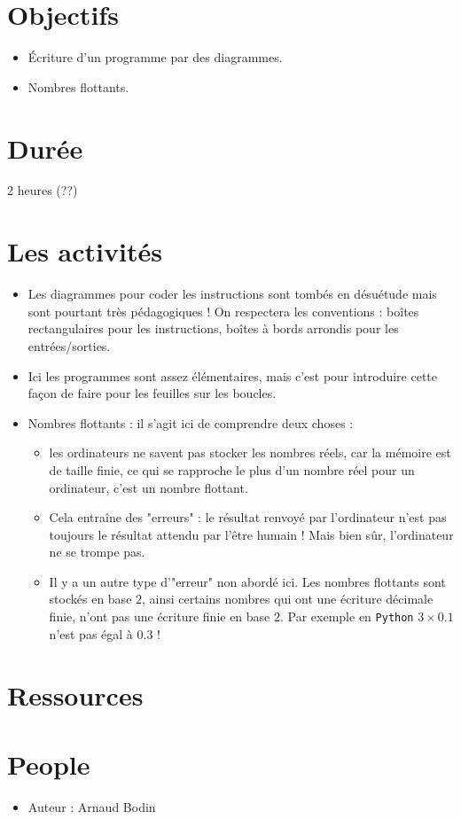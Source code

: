 \documentclass[class=report,crop=false, 12pt]{standalone}
\begin{document}



\section*{Objectifs}

\begin{itemize}
  \item \'Ecriture d'un programme par des diagrammes.
  \item Nombres flottants.
\end{itemize}


\section*{Durée}

2 heures (??)

\section*{Les activités}

\begin{itemize}
  \item Les diagrammes pour coder les instructions sont tombés en désuétude mais sont pourtant très pédagogiques ! On respectera les conventions : boîtes rectangulaires pour les instructions, boîtes à bords arrondis pour les entrées/sorties.
  
  \item Ici les programmes sont assez élémentaires, mais c'est pour introduire cette façon de faire pour les feuilles sur les boucles.
  
  \item Nombres flottants : il s'agit ici de comprendre deux choses :
  \begin{itemize}
    \item les ordinateurs ne savent pas stocker les nombres réels, car la mémoire est de taille finie, ce qui se rapproche le plus d'un nombre réel pour un ordinateur, c'est un nombre flottant.
    \item Cela entraîne des "erreurs" : le résultat renvoyé par l'ordinateur n'est pas toujours le résultat attendu par l'être humain ! Mais bien sûr, l'ordinateur ne se trompe pas.

  \item Il y a un autre type d'"erreur" non abordé ici. Les nombres flottants sont stockés en base $2$, ainsi certains nombres qui ont une écriture décimale finie, n'ont pas une écriture finie en base $2$. Par exemple en \texttt{Python} $3 \times 0.1$ n'est pas égal à $0.3$ !
  \end{itemize}
\end{itemize}


\section*{Ressources}


\section*{People}

\begin{itemize}
  \item Auteur : Arnaud Bodin
\end{itemize}
\end{document}
